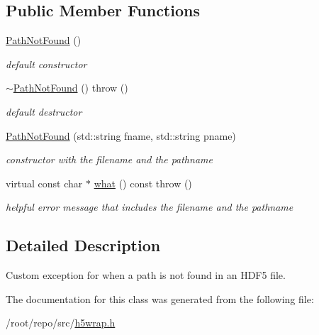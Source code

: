 \subsection*{Public Member Functions}
\begin{DoxyCompactItemize}
\item 
\mbox{\label{classh5wrap_1_1_path_not_found_a7b05229fb4f02920732f22622af1f08e}} 
\hyperlink{classh5wrap_1_1_path_not_found_a7b05229fb4f02920732f22622af1f08e}{Path\+Not\+Found} ()
\begin{DoxyCompactList}\small\item\em default constructor \end{DoxyCompactList}\item 
\mbox{\label{classh5wrap_1_1_path_not_found_acf9696ccdfb4a4c63454dbfc1dcde060}} 
\hyperlink{classh5wrap_1_1_path_not_found_acf9696ccdfb4a4c63454dbfc1dcde060}{$\sim$\+Path\+Not\+Found} ()  throw ()
\begin{DoxyCompactList}\small\item\em default destructor \end{DoxyCompactList}\item 
\mbox{\label{classh5wrap_1_1_path_not_found_aaedd26703acced17206eb8dabd4c5274}} 
\hyperlink{classh5wrap_1_1_path_not_found_aaedd26703acced17206eb8dabd4c5274}{Path\+Not\+Found} (std\+::string fname, std\+::string pname)
\begin{DoxyCompactList}\small\item\em constructor with the filename and the pathname \end{DoxyCompactList}\item 
\mbox{\label{classh5wrap_1_1_path_not_found_abb7e1904e38a063afedcd5f06e7835fd}} 
virtual const char $\ast$ \hyperlink{classh5wrap_1_1_path_not_found_abb7e1904e38a063afedcd5f06e7835fd}{what} () const  throw ()
\begin{DoxyCompactList}\small\item\em helpful error message that includes the filename and the pathname \end{DoxyCompactList}\end{DoxyCompactItemize}


\subsection{Detailed Description}
Custom exception for when a path is not found in an H\+D\+F5 file. 

The documentation for this class was generated from the following file\+:\begin{DoxyCompactItemize}
\item 
/root/repo/src/\hyperlink{h5wrap_8h}{h5wrap.\+h}\end{DoxyCompactItemize}
